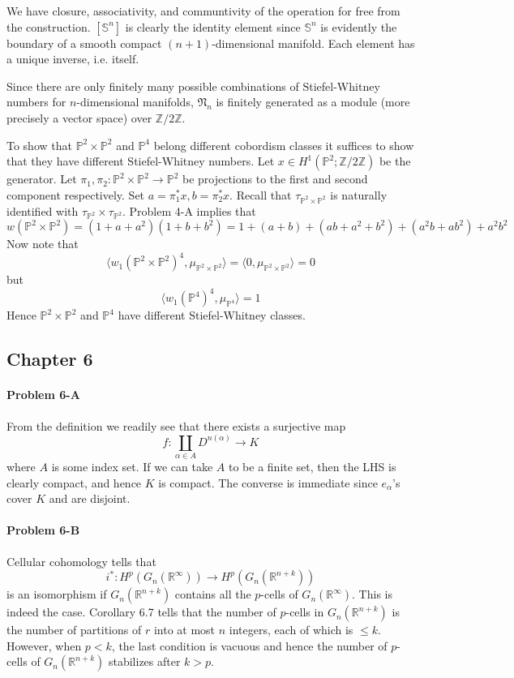 \documentclass[12pt]{article}
\theoremstyle{plain}
\theoremstyle{definition}
\newcommand{\IP}{\mathbb{P}}
\newcommand{\IR}{\mathbb{R}}
\newcommand{\IS}{\mathbb{S}}
\newcommand{\IZ}{\mathbb{Z}}
\newcommand{\<}{\langle}
\renewcommand{\>}{\rangle}
\newcommand{\fN}{\mathfrak{N}}
\begin{document}
We have closure, associativity, and communtivity of the operation for free from the construction. $[\IS^n]$ is clearly the identity element since $\IS^n$ is evidently the boundary of a smooth compact $(n+1)$-dimensional manifold. Each element has a unique inverse, i.e. itself. 

Since there are only finitely many possible combinations of Stiefel-Whitney numbers for $n$-dimensional manifolds, $\fN_n$ is finitely generated as a module (more precisely a vector space) over $\IZ/2\IZ$. 

To show that $\IP^2 \times \IP^2$ and $\IP^4$ belong different cobordism classes it suffices to show that they have different Stiefel-Whitney numbers. Let $x \in H^1(\IP^2; \IZ/2\IZ)$ be the generator. Let $\pi_1, \pi_2 : \IP^2 \times \IP^2 \to \IP^2$ be projections to the first and second component respectively. Set $a = \pi_1^* x, b = \pi_2^* x$. Recall that $\tau_{\IP^2 \times \IP^2}$ is naturally identified with $\tau_{\IP^2} \times \tau_{\IP^2}
$. Problem 4-A implies that 
$$ w(\IP^2 \times \IP^2) = (1 + a + a^2)(1 + b + b^2) = 1 + (a + b) + (ab + a^2 + b^2 ) + (a^2 b + a b^2) + a^2 b^2$$
Now note that 
$$ \< w_1(\IP^2 \times \IP^2)^4, \mu_{\IP^2 \times \IP^2} \> = \< 0, \mu_{\IP^2 \times \IP^2} \> = 0$$
but 
$$ \< w_1(\IP^4)^4, \mu_{\IP^4} \> = 1 $$
Hence $\IP^2 \times \IP^2$ and $\IP^4$ have different Stiefel-Whitney classes. 


\subsection*{Chapter 6}
\paragraph{Problem 6-A}
From the definition we readily see that there exists a surjective map 
$$ f : \coprod_{\alpha \in A} D^{n(\alpha)} \to K $$ where $A$ is some index set. If we can take $A$ to be a finite set, then the LHS is clearly compact, and hence $K$ is compact. The converse is immediate since $e_\alpha$'s cover $K$ and are disjoint. 

\paragraph{Problem 6-B}
Cellular cohomology tells that $$ i^* : H^p(G_n(\IR^\infty)) \to H^p(G_n(\IR^{n + k})) $$
is an isomorphism if $G_n(\IR^{n + k})$  contains all the $p$-cells of $G_n(\IR^\infty)$. This is indeed the case. Corollary 6.7 tells that the number of $p$-cells in $G_n(\IR^{n + k})$ is the number of partitions of $r$ into at most $n$ integers, each of which is $\le k$. However, when $p < k$, the last condition is vacuous and hence the number of $p$-cells of $G_n(\IR^{n + k})$ stabilizes after $k > p$. 
\end{document}
